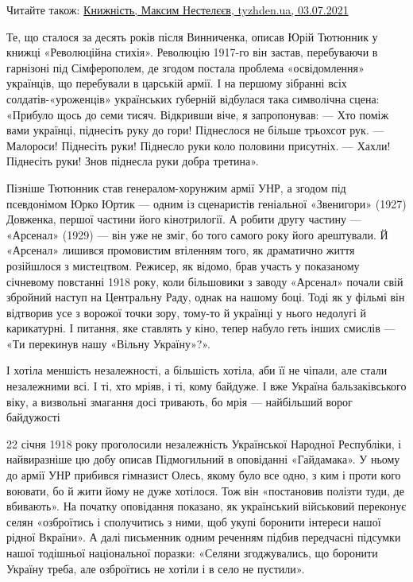 Читайте також: \href{https://tyzhden.ua/Columns/50/252254}{Книжність, Максим Нестелєєв, tyzhden.ua, 03.07.2021}

Те, що сталося за десять років після Винниченка, описав Юрій Тютюнник у книжці
«Революційна стихія». Революцію 1917-го він застав, перебуваючи в гарнізоні під
Сімферополем, де згодом постала проблема «освідомлення» українців, що
перебували в царській армії. І на першому зібранні всіх солдатів-«уроженців»
українських ґуберній відбулася така символічна сцена: «Прибуло щось до семи
тисяч. Відкривши віче, я запропонував: — Хто поміж вами українці, піднесіть
руку до гори! Піднеслося не більше трьохсот рук. — Малороси! Піднесіть руки!
Піднесло руки коло половини присутніх. — Хахли! Піднесіть руки! Знов піднесла
руки добра третина».

Пізніше Тютюнник став генералом-хорунжим армії УНР, а згодом під псевдонімом
Юрко Юртик — одним із сценаристів геніальної «Звенигори» (1927) Довженка,
першої частини його кінотрилогії. А робити другу частину — «Арсенал» (1929) —
він уже не зміг, бо того самого року його арештували. Й «Арсенал» лишився
промовистим втіленням того, як драматично життя розійшлося з мистецтвом.
Режисер, як відомо, брав участь у показаному січневому повстанні 1918 року,
коли більшовики з заводу «Арсенал» почали свій збройний наступ на Центральну
Раду, однак на нашому боці. Тоді як у фільмі він відтворив усе з ворожої точки
зору, тому-то й українці у нього недолугі й карикатурні. І питання, яке
ставлять у кіно, тепер набуло геть інших смислів — «Ти перекинув нашу «Вільну
Україну»?».

\begin{zznagolos}
І хотіла меншість незалежності, а більшість хотіла, аби її не чіпали, але стали
незалежними всі. І ті, хто мріяв, і ті, кому байдуже. І вже Україна
бальзаківського віку, а визвольні змагання досі тривають, бо мрія — найбільший
ворог байдужості	
\end{zznagolos}

22 січня 1918 року проголосили незалежність Української Народної Республіки, і
найвиразніше цю добу описав Підмогильний в оповіданні «Гайдамака». У ньому до
армії УНР прибився гімназист Олесь, якому було все одно, з ким і проти кого
воювати, бо й жити йому не дуже хотілося. Тож він «постановив полізти туди, де
вбивають». На початку оповідання показано, як український військовий переконує
селян «озброїтись і сполучитись з ними, щоб укупі боронити інтереси нашої
рідної Вкраїни». А далі письменник одним реченням підбив передчасні підсумки
нашої тодішньої національної поразки: «Селяни згоджувались, що боронити Україну
треба, але озброїтись не хотіли і в село не пустили».

